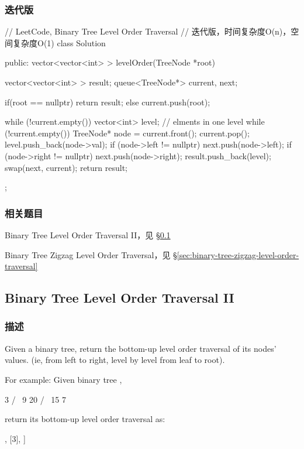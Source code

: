\subsubsection{迭代版}
\begin{Code}
// LeetCode, Binary Tree Level Order Traversal
// 迭代版，时间复杂度O(n)，空间复杂度O(1)
class Solution {
public:
    vector<vector<int> > levelOrder(TreeNode *root) {
        vector<vector<int> > result;
        queue<TreeNode*> current, next;
        
        if(root == nullptr) {
            return result;
        } else {
            current.push(root);
        }

        while (!current.empty()) {
            vector<int> level; // elments in one level
            while (!current.empty()) {
                TreeNode* node = current.front();
                current.pop();
                level.push_back(node->val);
                if (node->left != nullptr) next.push(node->left);
                if (node->right != nullptr) next.push(node->right);
            }
            result.push_back(level);
            swap(next, current);
        }
        return result;
    }
};
\end{Code}


\subsubsection{相关题目}
\begindot
\item Binary Tree Level Order Traversal II，见 \S \ref{sec:binary-tree-tevel-order-traversal-ii}
\item Binary Tree Zigzag Level Order Traversal，见 \S \ref{sec:binary-tree-zigzag-level-order-traversal}
\myenddot


\subsection{Binary Tree Level Order Traversal II}
\label{sec:binary-tree-tevel-order-traversal-ii}


\subsubsection{描述}
Given a binary tree, return the bottom-up level order traversal of its nodes' values. (ie, from left to right, level by level from leaf to root).

For example:
Given binary tree ,
\begin{Code}
    3
   / \
  9  20
    /  \
   15   7
\end{Code}
return its bottom-up level order traversal as:
\begin{Code}
[
  [15,7]
  [9,20],
  [3],
]
\end{Code}


